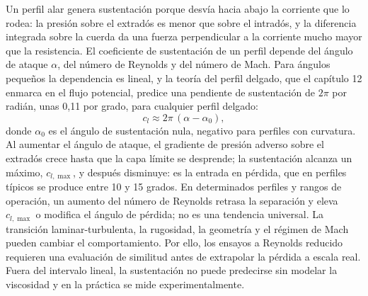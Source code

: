 \documentclass[10pt,openany]{book}
\begin{document}
Un perfil alar genera sustentación porque desvía hacia abajo la corriente que lo rodea: la presión sobre el extradós es menor que sobre el intradós, y la diferencia integrada sobre la cuerda da una fuerza perpendicular a la corriente mucho mayor que la resistencia. El coeficiente de sustentación de un perfil depende del ángulo de ataque \(\alpha\), del número de Reynolds y del número de Mach. Para ángulos pequeños la dependencia es lineal, y la teoría del perfil delgado, que el capítulo 12 enmarca en el flujo potencial, predice una pendiente de sustentación de \(2\pi\) por radián, unas 0,11 por grado, para cualquier perfil delgado:
\begin{equation}
c_l \approx 2\pi\,(\alpha - \alpha_0), \label{eq:c07-perfil}
\end{equation}
donde \(\alpha_0\) es el ángulo de sustentación nula, negativo para perfiles con curvatura. Al aumentar el ángulo de ataque, el gradiente de presión adverso sobre el extradós crece hasta que la capa límite se desprende; la sustentación alcanza un máximo, \(c_{l,\max}\), y después disminuye: es la entrada en pérdida, que en perfiles típicos se produce entre 10 y 15 grados. En determinados perfiles y rangos de operación, un aumento del número de Reynolds retrasa la separación y eleva \(c_{l,\max}\) o modifica el ángulo de pérdida; no es una tendencia universal. La transición laminar-turbulenta, la rugosidad, la geometría y el régimen de Mach pueden cambiar el comportamiento. Por ello, los ensayos a Reynolds reducido requieren una evaluación de similitud antes de extrapolar la pérdida a escala real. Fuera del intervalo lineal, la sustentación no puede predecirse sin modelar la viscosidad y en la práctica se mide experimentalmente.
\end{document}
